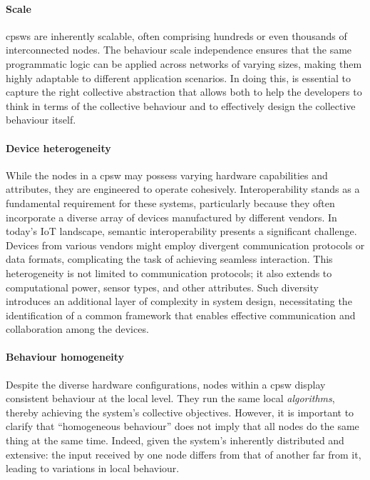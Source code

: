 \paragraph*{Scale}
\acp{cpsw} are inherently scalable, 
 often comprising hundreds or even thousands of interconnected nodes. 
 The behaviour scale independence ensures that the same programmatic logic can be applied across networks of varying sizes, 
 making them highly adaptable to different application scenarios.
 In doing this, is essential to capture the right collective abstraction that 
 allows both to help the developers to think in terms of the collective behaviour
 and to effectively design the collective behaviour itself.

\paragraph*{Device heterogeneity}
While the nodes in a \ac{cpsw} may possess varying hardware capabilities and attributes, they are engineered to operate cohesively. 
 Interoperability stands as a fundamental requirement for these systems, 
 particularly because they often incorporate a diverse array of devices manufactured by different vendors.
%
In today's IoT landscape, 
 semantic interoperability presents a significant challenge. 
 Devices from various vendors might employ divergent communication protocols or data formats, complicating the task of achieving seamless interaction. 
 This heterogeneity is not limited to communication protocols; 
 it also extends to computational power, sensor types, and other attributes. 
 Such diversity introduces an additional layer of complexity in system design, 
 necessitating the identification of a common framework that enables effective communication and collaboration among the devices.
\paragraph*{Behaviour homogeneity}
Despite the diverse hardware configurations, 
 nodes within a \ac{cpsw} display consistent behaviour at the local level.
 They run the same local \emph{algorithms}, thereby achieving the system's collective objectives.
 However, it is important to clarify that ``homogeneous behaviour'' does not imply that all nodes do the same thing at the same time.
 Indeed, given the system's inherently distributed and extensive: 
 the input received by one node differs from that of another far from it, 
 leading to variations in local behaviour.

